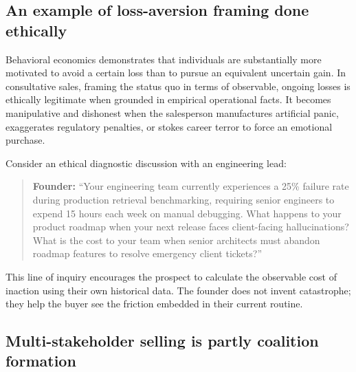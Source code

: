 \subsection{An example of loss-aversion framing done ethically}

Behavioral economics demonstrates that individuals are substantially more motivated to avoid a certain loss than to pursue an equivalent uncertain gain. In consultative sales, framing the status quo in terms of observable, ongoing losses is ethically legitimate when grounded in empirical operational facts. It becomes manipulative and dishonest when the salesperson manufactures artificial panic, exaggerates regulatory penalties, or stokes career terror to force an emotional purchase.

Consider an ethical diagnostic discussion with an engineering lead:
\begin{quote}
\textbf{Founder:} ``Your engineering team currently experiences a 25\% failure rate during production retrieval benchmarking, requiring senior engineers to expend 15 hours each week on manual debugging. What happens to your product roadmap when your next release faces client-facing hallucinations? What is the cost to your team when senior architects must abandon roadmap features to resolve emergency client tickets?''
\end{quote}
This line of inquiry encourages the prospect to calculate the observable cost of inaction using their own historical data. The founder does not invent catastrophe; they help the buyer see the friction embedded in their current routine.

\subsection{Multi-stakeholder selling is partly coalition formation}


